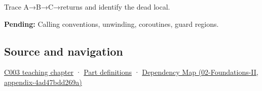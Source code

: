 Trace A→B→C→returns and identify the dead local.

\textbf{Pending:} Calling conventions, unwinding, coroutines, guard regions.

\subsection{Source and navigation}\label{source-and-navigation}

\href{Continuous\%20Notes/Computing\%20Foundations\%20-\%20From\%20Bits\%20to\%20C++\%20and\%20Systems\%20APIs\#Where\%20the\%20bytes\%20live}{C003 teaching chapter} · \hyperref[appendix-fd090d982a15]{Part definitions} · \href{}{Dependency Map (02-Foundations-II, appendix-4ad47bdd269a)}
